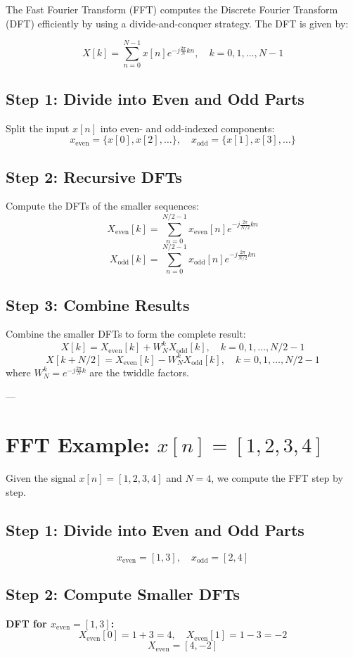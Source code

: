 \documentclass[a4paper]{report}
\begin{document}
The Fast Fourier Transform (FFT) computes the Discrete Fourier Transform (DFT) efficiently by using a divide-and-conquer strategy. The DFT is given by:

\[
	X[k] = \sum_{n=0}^{N-1} x[n] e^{-j \frac{2\pi}{N} kn}, \quad k = 0, 1, \dots, N-1
\]

\subsection*{Step 1: Divide into Even and Odd Parts}
Split the input \( x[n] \) into even- and odd-indexed components:
\[
	x_{\text{even}} = \{x[0], x[2], \dots\}, \quad x_{\text{odd}} = \{x[1], x[3], \dots\}
\]

\subsection*{Step 2: Recursive DFTs}
Compute the DFTs of the smaller sequences:
\[
	X_{\text{even}}[k] = \sum_{n=0}^{N/2-1} x_{\text{even}}[n] e^{-j \frac{2\pi}{N/2} kn}
\]
\[
	X_{\text{odd}}[k] = \sum_{n=0}^{N/2-1} x_{\text{odd}}[n] e^{-j \frac{2\pi}{N/2} kn}
\]

\subsection*{Step 3: Combine Results}
Combine the smaller DFTs to form the complete result:
\[
	X[k] = X_{\text{even}}[k] + W_N^k X_{\text{odd}}[k], \quad k = 0, 1, \dots, N/2-1
\]
\[
	X[k+N/2] = X_{\text{even}}[k] - W_N^k X_{\text{odd}}[k], \quad k = 0, 1, \dots, N/2-1
\]
where \( W_N^k = e^{-j \frac{2\pi}{N} k} \) are the twiddle factors.

---

\section*{FFT Example: \( x[n] = [1, 2, 3, 4] \)}

Given the signal \( x[n] = [1, 2, 3, 4] \) and \( N = 4 \), we compute the FFT step by step.

\subsection*{Step 1: Divide into Even and Odd Parts}
\[
	x_{\text{even}} = [1, 3], \quad x_{\text{odd}} = [2, 4]
\]

\subsection*{Step 2: Compute Smaller DFTs}
\textbf{DFT for \( x_{\text{even}} = [1, 3] \):}
\[
	X_{\text{even}}[0] = 1 + 3 = 4, \quad X_{\text{even}}[1] = 1 - 3 = -2
\]
\[
	X_{\text{even}} = [4, -2]
\]
\end{document}
